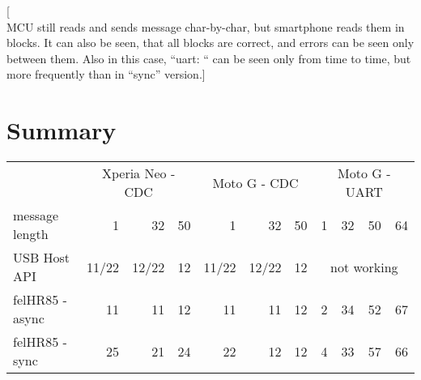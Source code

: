 [\\MCU still reads and sends message char-by-char, but smartphone reads them in
blocks. It can also be seen, that all blocks are correct, and errors can be
seen only between them. Also in this case, ``uart: `` can be seen only from
time to time, but more frequently than in ``sync'' version.]


\section{Summary}

\begin{center}
\begin{tabular}{l|r|r|r|r|r|r|r|r|r|r}
& \multicolumn{3}{c|}{Xperia Neo - CDC} & \multicolumn{3}{c|}{Moto G - CDC} &
\multicolumn{4}{c}{Moto G - UART} \\
message length & 1 & 32 & \hspace{3ex}50 & 
1 & 32 & \hspace{3ex}50 & \hspace{1ex}1 & 
32 & 50 & 64
\\
\hline
USB Host API & 
11/22 & 12/22 & 12 & 11/22 & 12/22 & 12 &
\multicolumn{4}{c}{\cellcolor{red!50}not working}
\\
felHR85 - async & 
11 & 11 & 12 & 11 & 11 & 12 & 2 & 34 & \cellcolor{yellow!50}52 & 67 \\
felHR85 - sync & 
25 & 21 & 24 & 22 & 12 & 12 & 4 & 33 & \cellcolor{yellow!50}57 & 66
\end{tabular}
\end{center}